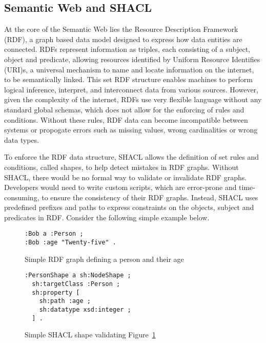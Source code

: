 \documentclass[
  english,        %
  font=times,     %
  twocolumn,      %
]{tumarticle}
\begin{document}
\subsection{Semantic Web and SHACL}
At the core of the Semantic Web lies the Resource Description Framework (RDF), a graph based data model designed to express how data entities are connected. 
RDFs represent information as triples, each consisting of a subject, object and predicate, allowing resources identified by Uniform Resource Identifies (URI)s, a universal mechanism to name and locate information on the internet, to be semantically linked.  
This set RDF structure enables machines to perform logical inference, interpret, and interconnect data from various sources. 
However, given the complexity of the internet, RDFs use very flexible language without any standard global schemas, which does not allow for the enforcing of rules and conditions. 
Without these rules, RDF data can become incompatible between systems or propogate errors such as missing values, wrong cardinalities or wrong data types.  

To enforce the RDF data structure, SHACL allows the definition of set rules and conditions, called shapes, to help detect mistakes in RDF graphs.
Without SHACL, there would be no formal way to validate or invalidate RDF graphs.
Developers would need to write custom scripts, which are error-prone and time-consuming, to ensure the consistency of their RDF graphs. 
Instead, SHACL uses predefined prefixes and paths to express constraints on the objects, subject and predicates in RDF. 
Consider the following simple example below. 

\begin{figure}[h]
\begin{lstlisting}
:Bob a :Person ;
:Bob :age "Twenty-five" .
\end{lstlisting}
\caption{Simple RDF graph defining a person and their age}
\label{fig:rdf-graph}
\end{figure}


\begin{figure}[h]
\begin{lstlisting}
:PersonShape a sh:NodeShape ;
  sh:targetClass :Person ;
  sh:property [
    sh:path :age ;
    sh:datatype xsd:integer ;
  ] .
\end{lstlisting}
\caption{Simple SHACL shape validating Figure~\ref{fig:rdf-graph}}
\label{fig:shacl-graph}
\end{figure}

\vspace{3cm}
\end{document}
